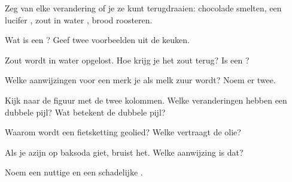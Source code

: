 \begin{exercise}[$\star$]\label{exo:g5:irreversible-changes:1}
Zeg van elke verandering of je ze kunt terugdraaien: chocolade smelten,
een lucifer , zout in water , brood roosteren.
\end{exercise}

\begin{exercise}[$\star$]\label{exo:g5:irreversible-changes:2}
Wat is een ? Geef twee voorbeelden uit de keuken.
\end{exercise}

\begin{exercise}[$\star$]\label{exo:g5:irreversible-changes:3}
Zout wordt in water opgelost. Hoe krijg je het zout terug? Is 
een ?
\end{exercise}

\begin{exercise}[$\star$]\label{exo:g5:irreversible-changes:4}
Welke aanwijzingen voor een  merk je als melk zuur
wordt? Noem er twee.
\end{exercise}

\begin{exercise}[$\star$]\label{exo:g5:irreversible-changes:5}
Kijk naar de figuur met de twee kolommen. Welke veranderingen hebben een
dubbele pijl? Wat betekent de dubbele pijl?
\end{exercise}

\begin{exercise}[$\star$]\label{exo:g5:irreversible-changes:6}
Waarom wordt een fietsketting geolied? Welke 
vertraagt de olie?
\end{exercise}

\begin{exercise}[$\star$]\label{exo:g5:irreversible-changes:7}
Als je azijn op baksoda giet, bruist het. Welke aanwijzing is dat?
\end{exercise}

\begin{exercise}[$\star$]\label{exo:g5:irreversible-changes:8}
Noem een nuttige en een schadelijke .
\end{exercise}

